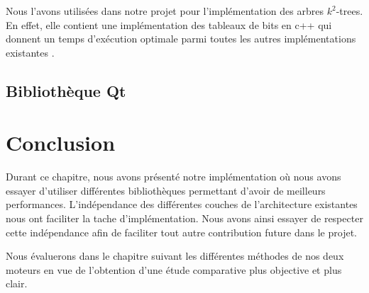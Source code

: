 Nous l'avons utilisées dans notre projet pour l'implémentation des arbres $k^2$-trees. En effet, elle contient une implémentation des tableaux de bits en c++ qui donnent un temps d'exécution optimale parmi toutes les autres implémentations existantes \citep{pieterse2010performance}.  



		\subsection{Bibliothèque Qt }
	\section{Conclusion}
	
Durant ce chapitre, nous avons présenté notre implémentation où nous avons essayer d'utiliser différentes bibliothèques permettant d'avoir de meilleurs performances. L'indépendance des différentes couches de l'architecture existantes nous ont faciliter la tache d'implémentation. Nous avons ainsi essayer de respecter cette indépendance afin de faciliter tout autre contribution future dans le projet. 

Nous évaluerons dans le chapitre suivant les différentes méthodes de nos deux moteurs en vue de l'obtention d'une étude comparative plus objective et plus clair.